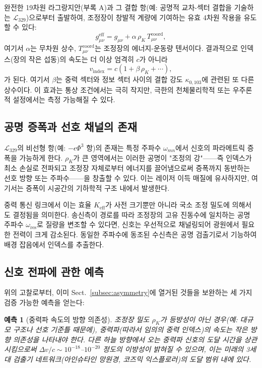 \documentclass[12pt,a4paper]{article}
\newcommand{\Keff}{K_{\mathrm{eff}}}
\newtheorem{prediction}{예측}   %
\begin{document}
	완전한 19차원 라그랑지안(부록 A)과 그 결합 항(예: 공명적 교차-섹터 결합을 기술하는 \(\mathcal{L}_{329}\))으로부터 출발하여, 조정장이 창발적 계량에 기여하는 유효 4차원 작용을 유도할 수 있다:
	\begin{equation}
		g_{\mu\nu}^{\mathrm{eff}} = g_{\mu\nu} + \alpha \, \rho_K \, T_{\mu\nu}^{\mathrm{coord}},
	\end{equation}
	여기서 \(\alpha\)는 무차원 상수, \(T_{\mu\nu}^{\mathrm{coord}}\)는 조정장의 에너지-운동량 텐서이다. 결과적으로 인덱스(장의 작은 섭동)의 속도는 더 이상 엄격히 \(c\)가 아니라
	\begin{equation}
		v_{\mathrm{index}} = c \left(1 + \beta \, \rho_K + \cdots \right),
	\end{equation}
	가 된다. 여기서 \(\beta\)는 중력 섹터와 정보 섹터 사이의 결합 강도 \(\kappa_{0,103}\)에 관련된 또 다른 상수이다. 이 효과는 통상 조건에서는 극히 작지만, 극한의 천체물리학적 또는 우주론적 설정에서는 측정 가능해질 수 있다.
	
	\subsection{공명 증폭과 선호 채널의 존재}
	
	\(\mathcal{L}_{329}\)의 비선형 항(예: \(-\epsilon \Phi^3\) 항)의 존재는 특정 주파수 \(\omega_{mn}\)에서 신호의 파라메트릭 증폭을 가능하게 한다. \(\rho_K\)가 큰 영역에서는 이러한 공명이 "조정의 강"——즉 인덱스가 최소 손실로 전파되고 조정장 자체로부터 에너지를 끌어냄으로써 증폭까지 동반하는 선호 방향 또는 주파수——을 창출할 수 있다. 이는 레이저 이득 매질에 유사하지만, 여기서는 증폭이 시공간의 기하학적 구조 내에서 발생한다.
	
	중력 통신 링크에서 이는 효율 \(\Keff\)가 사전 크기뿐만 아니라 국소 조정 밀도에 의해서도 결정됨을 의미한다. 송신측이 경로를 따라 조정장의 고유 진동수에 일치하는 공명 주파수 \(\omega_{\mathrm{res}}\)로 질량을 변조할 수 있다면, 신호는 우선적으로 채널링되어 광원에서 필요한 전력이 크게 감소된다. 동일한 주파수에 동조된 수신측은 공명 검출기로서 기능하여 배경 잡음에서 인덱스를 추출한다.
	
	\subsection{신호 전파에 관한 예측}
	
	위의 고찰로부터, 이미 Sect.~\ref{subsec:asymmetry}에 열거된 것들을 보완하는 세 가지 검증 가능한 예측을 얻는다:
	
	\begin{prediction}[중력파 속도의 방향 의존성]
		조정장 밀도 \(\rho_K\)가 등방성이 아닌 경우(예: 대규모 구조나 선호 기준틀 때문에), 중력파(따라서 임의의 중력 인덱스)의 속도는 작은 방향 의존성을 나타내야 한다. 다른 하늘 방향에서 오는 중력파 신호의 도달 시간을 상관시킴으로써 \(\Delta v/c \sim 10^{-18}\)–\(10^{-20}\) 정도의 이방성이 밝혀질 수 있으며, 이는 미래의 3세대 검출기 네트워크(아인슈타인 망원경, 코즈믹 익스플로러)의 도달 범위 내에 있다.
	\end{prediction}
	
\end{document}
